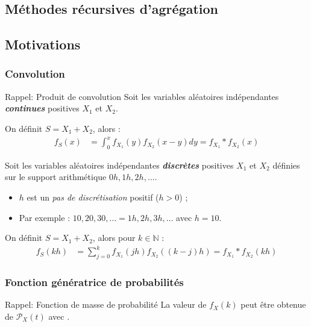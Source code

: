 \documentclass[10pt, french]{article}
\begin{document}
\begin{multicols*}{2}



\pagebreak
\section{Méthodes récursives d'agrégation}
\subsection{Motivations}
\subsubsection{Convolution}
\begin{rappel}{Rappel: Produit de convolution}
Soit les variables aléatoires indépendantes \textbf{\textit{continues}} positives $X_{1}$ et $X_{2}$.

\bigskip

On définit $S	=	X_{1} + X_{2}$, alors :
\begin{align*}
	f_{S}(x)
	&=	\int_{0}^{x} f_{X_{1}}(y) f_{X_{2}}(x - y) dy
	=	f_{X_{1}} \ast f_{X_{2}}(x)
\end{align*}

\tcbline

Soit les variables aléatoires indépendantes \textbf{\textit{discrètes}} positives $X_{1}$ et $X_{2}$ définies sur le support arithmétique $0h, 1h, 2h, \dots$.
\begin{itemize}
	\item	$h$ est un \og \textit{pas de discrétisation} \fg{} positif ($h > 0$) ;
	\item	Par exemple : $10, 20, 30, \ldots  = 1h, 2h, 3h, \dots$ avec $h = 10$.
\end{itemize}

On définit $S	=	X_{1} + X_{2}$, alors pour $k \in \mathbb{N}$ :
\begin{align*}
	f_{S}(kh)
	&=	\sum_{j = 0}^{k} f_{X_{1}}(jh) f_{X_{2}}((k - j)h) 
	=	f_{X_{1}} \ast f_{X_{2}}(kh)
\end{align*}
\end{rappel}


\subsubsection{Fonction génératrice de probabilités}
\begin{rappel}{Rappel: Fonction de masse de probabilité}
La valeur de $f_{X}(k)$ peut être obtenue de $\mathcal{P}_{X}(t)$ avec .
\end{rappel}


\end{multicols*}
\end{document}
